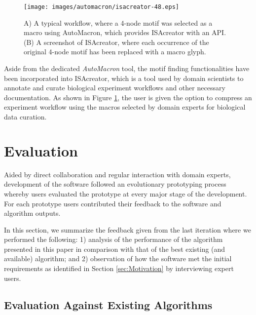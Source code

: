 
\begin{figure}[ht!]
\centering
\texttt{[image: images/automacron/isacreator-48.eps]}
\caption{A) A typical workflow, where a 4-node motif was selected as a macro using AutoMacron, which provides ISAcreator with an API. (B) A screenshot of  ISAcreator, where each occurrence of the original 4-node motif has been replaced with a macro glyph.}
\vspace{-1mm}
\label{fig:isacreator}
\end{figure}

Aside from the dedicated \emph{AutoMacron} tool, the motif finding functionalities have been incorporated into ISAcreator, which is a tool used by domain scientists to annotate and curate biological experiment workflows and other necessary documentation. As shown in Figure \ref{fig:isacreator}, the user is given the option to compress an experiment workflow using the macros selected by domain experts for biological data curation. 

\section{Evaluation}

Aided by direct collaboration and regular interaction with domain experts, development of the software followed an evolutionary prototyping process whereby users evaluated the prototype at every major stage of the development. For each prototype users contributed their feedback to the software and algorithm outputs. 

In this section, we summarize the feedback given from the last iteration where we performed the following: 1) analysis of the performance of the algorithm presented in this paper in comparison with that of the best existing (and available) algorithm; and 2) observation of how the software met the initial requirements as identified in Section \ref{sec:Motivation} by interviewing expert users.

\subsection{Evaluation Against Existing Algorithms}

